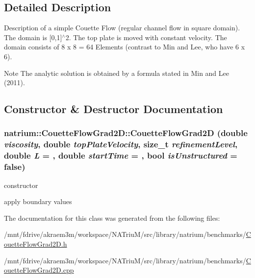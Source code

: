\subsection{Detailed Description}
Description of a simple Couette Flow (regular channel flow in square domain). The domain is \mbox{[}0,1\mbox{]}$^\wedge$2. The top plate is moved with constant velocity. The domain consists of 8 x 8 = 64 Elements (contrast to Min and Lee, who have 6 x 6). \begin{DoxyNote}{Note}
The analytic solution is obtained by a formula stated in Min and Lee (2011). 
\end{DoxyNote}


\subsection{Constructor \& Destructor Documentation}
\hypertarget{classnatrium_1_1CouetteFlowGrad2D_a06404aab631016fcf3850339402550e3}{
\subsubsection[{CouetteFlowGrad2D}]{\setlength{\rightskip}{0pt plus 5cm}natrium::CouetteFlowGrad2D::CouetteFlowGrad2D (double {\em viscosity}, \/  double {\em topPlateVelocity}, \/  size\_\-t {\em refinementLevel}, \/  double {\em L} = {}, \/  double {\em startTime} = {}, \/  bool {\em isUnstructured} = {\ttfamily false})}}
\label{classnatrium_1_1CouetteFlowGrad2D_a06404aab631016fcf3850339402550e3}


constructor 

apply boundary values 

The documentation for this class was generated from the following files:\begin{DoxyCompactItemize}
\item 
/mnt/fdrive/akraem3m/workspace/NATriuM/src/library/natrium/benchmarks/\hyperlink{CouetteFlowGrad2D_8h}{CouetteFlowGrad2D.h}\item 
/mnt/fdrive/akraem3m/workspace/NATriuM/src/library/natrium/benchmarks/\hyperlink{CouetteFlowGrad2D_8cpp}{CouetteFlowGrad2D.cpp}\end{DoxyCompactItemize}
